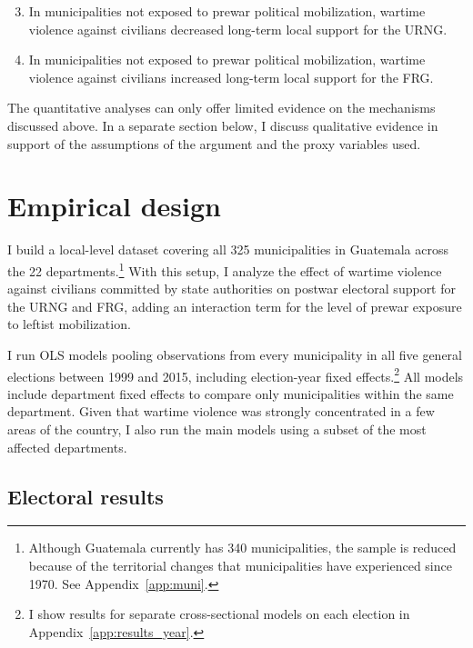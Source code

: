 \documentclass[12pt, notitlepage]{article}
\begin{document}
\begin{enumerate}[label={\bf H\arabic*:} , ref=H\arabic* , wide=0.5em, leftmargin=*]
  \setcounter{enumi}{2}
  \item \label{h:URNG-no-mob} In municipalities not exposed to prewar political mobilization, wartime violence against civilians decreased long-term local support for the URNG.
  \item \label{h:FRG-no-mob} In municipalities not exposed to prewar political mobilization, wartime violence against civilians increased long-term local support for the FRG.
\end{enumerate}

The quantitative analyses can only offer limited evidence on the mechanisms discussed above.
In a separate section below, I discuss qualitative evidence in support of the assumptions of the argument and the proxy variables used.

\section*{Empirical design}

I build a local-level dataset covering all 325 municipalities in Guatemala across the 22 departments.\footnote{Although Guatemala currently has 340 municipalities, the sample is reduced because of the territorial changes that municipalities have experienced since 1970. See Appendix~\ref{app:muni}.}
With this setup, I analyze the effect of wartime violence against civilians committed by state authorities on postwar electoral support for the URNG and FRG, adding an interaction term for the level of prewar exposure to leftist mobilization.

I run OLS models pooling observations from every municipality in all five general elections between 1999 and 2015, including election-year fixed effects.\footnote{I show results for separate cross-sectional models on each election in Appendix~\ref{app:results_year}.}
All models include department fixed effects to compare only municipalities within the same department.
Given that wartime violence was strongly concentrated in a few areas of the country, I also run the main models using a subset of the most affected departments.

\subsection*{Electoral results}
\end{document}

